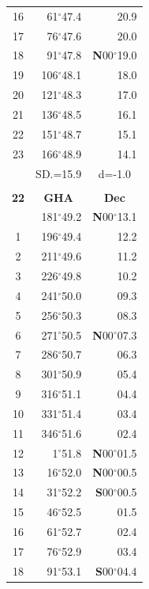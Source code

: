\documentclass[10pt, a4paper]{report}
\begin{document}
\begin{scriptsize}
\begin{tabular*}{0.2\textwidth}[t]{@{\extracolsep{\fill}}|c|rr|}
16 & 61$^\circ$47.4 & 20.9\\
17 & 76$^\circ$47.6 & 20.0\\[2Pt]
18 & 91$^\circ$47.8 & \textbf{N}00$^\circ$19.0\\
19 & 106$^\circ$48.1 & 18.0\\
20 & 121$^\circ$48.3 & 17.0\\
21 & 136$^\circ$48.5 & \raisebox{0.24ex}{\boldmath$\cdot$~\boldmath$\cdot$~~}16.1\\
22 & 151$^\circ$48.7 & 15.1\\
23 & 166$^\circ$48.9 & 14.1\\
\hline
\rule{0pt}{2.4ex} & \multicolumn{1}{c}{SD.=15.9} & \multicolumn{1}{c|}{d=-1.0}\\
\hline
\multicolumn{1}{c}{}\\[-0.5ex]\hline
\multicolumn{1}{|c|}{\rule{0pt}{2.6ex}\textbf{22}} & \multicolumn{1}{c}{\textbf{GHA}} & \multicolumn{1}{c|}{\textbf{Dec}}\\
\hline\rule{0pt}{2.6ex}\noindent
0 & 181$^\circ$49.2 & \textbf{N}00$^\circ$13.1\\
1 & 196$^\circ$49.4 & 12.2\\
2 & 211$^\circ$49.6 & 11.2\\
3 & 226$^\circ$49.8 & \raisebox{0.24ex}{\boldmath$\cdot$~\boldmath$\cdot$~~}10.2\\
4 & 241$^\circ$50.0 & 09.3\\
5 & 256$^\circ$50.3 & 08.3\\[2Pt]
6 & 271$^\circ$50.5 & \textbf{N}00$^\circ$07.3\\
7 & 286$^\circ$50.7 & 06.3\\
8 & 301$^\circ$50.9 & 05.4\\
9 & 316$^\circ$51.1 & \raisebox{0.24ex}{\boldmath$\cdot$~\boldmath$\cdot$~~}04.4\\
10 & 331$^\circ$51.4 & 03.4\\
11 & 346$^\circ$51.6 & 02.4\\[2Pt]
12 & 1$^\circ$51.8 & \textbf{N}00$^\circ$01.5\\
13 & 16$^\circ$52.0 & \textbf{N}00$^\circ$00.5\\
14 & 31$^\circ$52.2 & \textbf{S}00$^\circ$00.5\\
15 & 46$^\circ$52.5 & \raisebox{0.24ex}{\boldmath$\cdot$~\boldmath$\cdot$~~}01.5\\
16 & 61$^\circ$52.7 & 02.4\\
17 & 76$^\circ$52.9 & 03.4\\[2Pt]
18 & 91$^\circ$53.1 & \textbf{S}00$^\circ$04.4\\

\end{tabular*}
\end{scriptsize}
\end{document}
